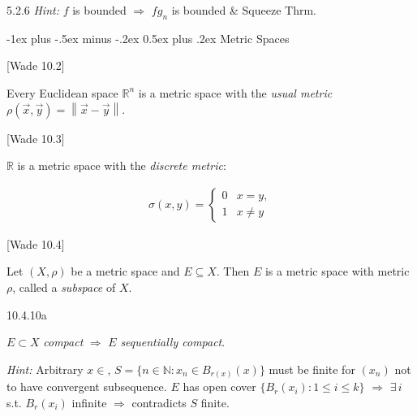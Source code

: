 \documentclass[10pt]{article} %
\makeatletter
\newcommand{\cw}[1]{[Wade #1]}
\newcommand{\Hint}{\vspace{0.2em}\textit{Hint: }}
\renewcommand{\leq}{\leqslant}
\newcommand{\norm}[1]{\left\lVert#1\right\rVert}
\renewcommand{\section}{\@startsection{section}{1}{0mm}%
                                {-1ex plus -.5ex minus -.2ex}%
                                {0.5ex plus .2ex}%
                                {\normalfont\large\bfseries}}
\makeatother
\begin{document}
\begin{multicols}{3}
\begin{exercise}{5.2.6}{}
    \Hint $f$ is bounded $\Rightarrow$ $fg_n$ is bounded \& Squeeze Thrm.

\end{exercise}


\section{Metric Spaces}

\begin{example}{\cw{10.2}}{}

    Every Euclidean space $\mathbb{R}^n$ is a metric space with the \emph{usual metric} $\rho(\vec{x},\vec{y}) = \norm{\vec{x} - \vec{y}}$.

\end{example}

\begin{definition}{\cw{10.3}}{}

    $\mathbb{R}$ is a metric space with the \emph{discrete metric}:

        \begin{align*}
            \sigma(x,y) =
            \begin{cases}
                0 & x = y, \\
                1 & x \neq y
            \end{cases}
        \end{align*}

\end{definition}

\begin{example}{\cw{10.4}}{}

    Let $(X,\rho)$ be a metric space and $E \subseteq X$. Then $E$ is a metric space with metric $\rho$, called a \emph{subspace} of $X$.

\end{example}

\begin{exercise}{10.4.10a}{}

    $E \subset X$ \emph{compact} $\Rightarrow$ $E$ \emph{sequentially compact}.

    \Hint Arbitrary $x \in $, $S = \{n \in \mathbb{N}: x_n \in B_{r(x)}(x)\}$ must be finite for $(x_n)$ not to have convergent subsequence. $E$ has open cover $\{B_r(x_i): 1 \leq i \leq k\}$ $\Rightarrow$ $\exists \, i$ s.t. $B_r(x_i)$ infinite $\Rightarrow$ contradicts $S$ finite.


\end{exercise}
\end{multicols}
\end{document}
